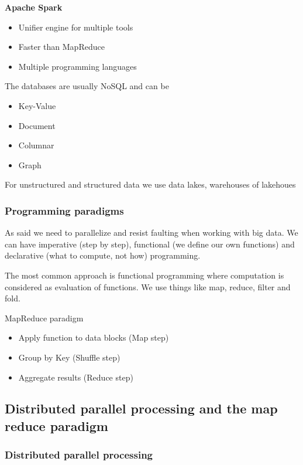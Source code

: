 \textbf{Apache Spark}

\begin{itemize}
    \item Unifier engine for multiple tools
    \item Faster than MapReduce
    \item Multiple programming languages
\end{itemize}

The databases are usually NoSQL and can be
\begin{itemize}
    \item Key-Value
    \item Document
    \item Columnar
    \item Graph 
\end{itemize}

For unstructured and structured data we use data lakes, warehouses of lakehoues

\subsubsection{Programming paradigms}

As said we need to parallelize and resist faulting when working with big data. We can have imperative (step by step), functional (we define our own functions) and declarative (what to compute, not how) programming. 

\vspace{10pt}

The most common approach is functional programming where computation is considered as evaluation of functions. We use things like map, reduce, filter and fold.

\vspace{10pt}

MapReduce paradigm
\begin{itemize}
    \item Apply function to data blocks (Map step)
    \item Group by Key (Shuffle step)
    \item Aggregate results (Reduce step)
\end{itemize}

\subsection{Distributed parallel processing and the map reduce paradigm}

\subsubsection{Distributed parallel processing}

